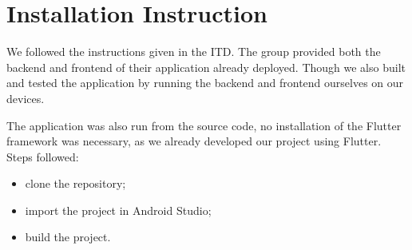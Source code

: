 \chapter{Installation Instruction}
We followed the instructions given in the ITD. The group provided both the backend and frontend of their application already deployed.
Though we also built and tested the application by running the backend and frontend ourselves on our devices.

The application was also run from the source code, no installation of the Flutter framework was necessary, as we already developed our project using Flutter. Steps followed:
\begin{itemize}
	\item clone the repository;
	\item import the project in Android Studio;
	\item build the project.
\end{itemize}
